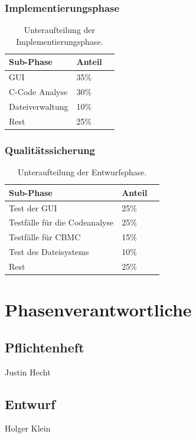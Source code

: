 \documentclass[a4paper]{scrreprt}
\begin{document}
\subsection{Implementierungsphase}

\begin{table}[H]
\centering
  \begin{tabular}{|p{3cm}|P{2cm}|P{2cm}|}
    Sub-Phase & Anteil \\ \hline
    GUI & 35\%\\ \hline
    C-Code Analyse & 30\% \\ \hline
    Dateiverwaltung & 10\% \\ \hline
    Rest & 25\%  \\
  \end{tabular}
  \newline\newline
  \caption{Unteraufteilung der Implementierungsphase.}\label{impl}
\end{table} 

\subsection{Qualitätssicherung}
\begin{table}[H]
\centering
  \begin{tabular}{|p{3cm}|P{2cm}|P{2cm}|}
    Sub-Phase & Anteil \\ \hline
    Test der GUI & 25\% \\ \hline
    Testfälle  für die Codeanalyse & 25\% \\ \hline
    Testfälle für CBMC & 15\% \\ \hline
    Test des Dateisystems & 10\% \\ \hline
    Rest & 25\%  \\
  \end{tabular}
  \newline\newline
  \caption{Unteraufteilung der Entwurfsphase.}\label{qs}
\end{table}


\chapter{Phasenverantwortliche}
\section{Pflichtenheft} Justin Hecht
\section{Entwurf} Holger Klein 
\end{document}
